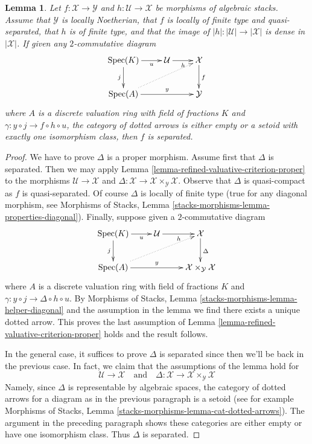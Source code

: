 \documentclass{stacks-project}
\theoremstyle{plain}
\newtheorem{lemma}[subsection]{Lemma}
\theoremstyle{definition}
\theoremstyle{remark}
\numberwithin{equation}{subsection}
\def\Spec{\mathop{\mathrm{Spec}}}
\begin{document}
\begin{lemma}
\label{lemma-refined-valuative-criterion-separated}
Let $f : \mathcal{X} \to \mathcal{Y}$ and $h : \mathcal{U} \to \mathcal{X}$
be morphisms of algebraic stacks. Assume that $\mathcal{Y}$ is
locally Noetherian, that $f$ is locally of finite type and quasi-separated,
that $h$ is of finite type, and that the image of
$|h| : |\mathcal{U}| \to |\mathcal{X}|$ is dense in $|\mathcal{X}|$.
If given any $2$-commutative diagram
$$
\xymatrix{
\Spec(K) \ar[r]_-u \ar[d]_j & \mathcal{U} \ar[r]_h & \mathcal{X} \ar[d]^f \\
\Spec(A) \ar[rr]^-y \ar@{..>}[rru] & & \mathcal{Y}
}
$$
where $A$ is a discrete valuation ring with field of fractions $K$
and $\gamma : y \circ j \to f \circ h \circ u$, the category
of dotted arrows is either empty or a setoid with exactly
one isomorphism class, then $f$ is separated.
\end{lemma}

\begin{proof}
We have to prove $\Delta$ is a proper morphism.
Assume first that $\Delta$ is separated. Then we may apply
Lemma \ref{lemma-refined-valuative-criterion-proper}
to the morphisms $\mathcal{U} \to \mathcal{X}$ and
$\Delta : \mathcal{X} \to \mathcal{X} \times_\mathcal{Y} \mathcal{X}$.
Observe that $\Delta$ is quasi-compact as $f$ is quasi-separated.
Of course $\Delta$ is locally of finite type (true for any
diagonal morphism, see Morphisms of Stacks, Lemma
\ref{stacks-morphisms-lemma-properties-diagonal}).
Finally, suppose given a $2$-commutative diagram
$$
\xymatrix{
\Spec(K) \ar[r]_-u \ar[d]_j &
\mathcal{U} \ar[r]_h &
\mathcal{X} \ar[d]^\Delta \\
\Spec(A) \ar[rr]^-y \ar@{..>}[rru] & &
\mathcal{X} \times_\mathcal{Y} \mathcal{X}
}
$$
where $A$ is a discrete valuation ring with field of fractions $K$
and $\gamma : y \circ j \to \Delta \circ h \circ u$.
By Morphisms of Stacks, Lemma \ref{stacks-morphisms-lemma-helper-diagonal}
and the assumption in the lemma
we find there exists a unique dotted arrow.
This proves the last assumption of
Lemma \ref{lemma-refined-valuative-criterion-proper}
holds and the result follows.

\medskip\noindent
In the general case, it suffices to prove $\Delta$ is separated
since then we'll be back in the previous case. In fact, we claim
that the assumptions of the lemma hold for
$$
\mathcal{U} \to \mathcal{X}
\quad\text{and}\quad
\Delta :
\mathcal{X} \to
\mathcal{X} \times_\mathcal{Y} \mathcal{X}
$$
Namely, since $\Delta$ is representable by algebraic spaces, the
category of dotted arrows for a diagram as in the previous paragraph
is a setoid (see for example
Morphisms of Stacks, Lemma \ref{stacks-morphisms-lemma-cat-dotted-arrows}).
The argument in the preceding paragraph shows these categories
are either empty or have one isomorphism class.
Thus $\Delta$ is separated.
\end{proof}
\end{document}
